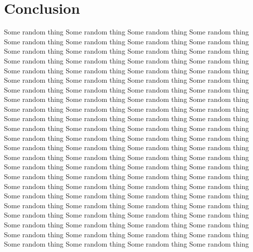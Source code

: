 \chapter{Conclusion}
\label{chap:conclusion}
Some random thing Some random thing Some random thing Some random thing Some random thing Some random thing Some random thing Some random thing Some random thing Some random thing Some random thing Some random thing Some random thing Some random thing Some random thing Some random thing Some random thing Some random thing Some random thing Some random thing Some random thing Some random thing Some random thing  Some random thing Some random thing Some random thing Some random thing Some random thing Some random thing Some random thing Some random thing Some random thing Some random thing Some random thing Some random thing Some random thing Some random thing Some random thing Some random thing Some random thing Some random thing Some random thing Some random thing Some random thing Some random thing Some random thing  Some random thing Some random thing Some random thing Some random thing Some random thing Some random thing Some random thing Some random thing Some random thing Some random thing Some random thing Some random thing Some random thing Some random thing Some random thing Some random thing Some random thing Some random thing Some random thing Some random thing Some random thing Some random thing Some random thing  Some random thing Some random thing Some random thing Some random thing Some random thing Some random thing Some random thing Some random thing Some random thing Some random thing Some random thing Some random thing Some random thing Some random thing Some random thing Some random thing Some random thing Some random thing Some random thing Some random thing Some random thing Some random thing Some random thing  